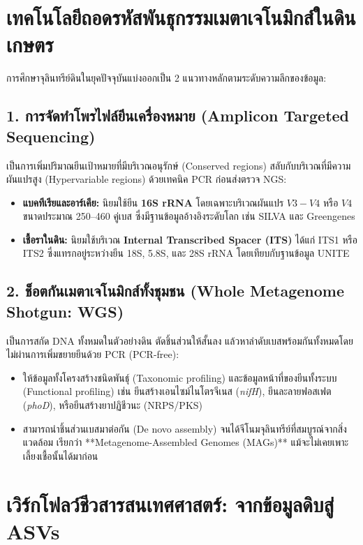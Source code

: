 \section{เทคโนโลยีถอดรหัสพันธุกรรมเมตาเจโนมิกส์ในดินเกษตร}

การศึกษาจุลินทรีย์ดินในยุคปัจจุบันแบ่งออกเป็น 2 แนวทางหลักตามระดับความลึกของข้อมูล:

\subsection{1. การจัดทำโพรไฟล์ยีนเครื่องหมาย (Amplicon Targeted Sequencing)}
เป็นการเพิ่มปริมาณยีนเป้าหมายที่มีบริเวณอนุรักษ์ (Conserved regions) สลับกับบริเวณที่มีความผันแปรสูง (Hypervariable regions) ด้วยเทคนิค PCR ก่อนส่งตรวจ NGS:
\begin{itemize}
    \item \textbf{แบคทีเรียและอาร์เคีย:} นิยมใช้ยีน \textbf{16S rRNA} โดยเฉพาะบริเวณผันแปร $V3-V4$ หรือ $V4$ ขนาดประมาณ 250--460 คู่เบส ซึ่งมีฐานข้อมูลอ้างอิงระดับโลก เช่น SILVA และ Greengenes
    \item \textbf{เชื้อราในดิน:} นิยมใช้บริเวณ \textbf{Internal Transcribed Spacer (ITS)} ได้แก่ ITS1 หรือ ITS2 ซึ่งแทรกอยู่ระหว่างยีน 18S, 5.8S, และ 28S rRNA โดยเทียบกับฐานข้อมูล UNITE
\end{itemize}

\subsection{2. ช็อตกันเมตาเจโนมิกส์ทั้งชุมชน (Whole Metagenome Shotgun: WGS)}
เป็นการสกัด DNA ทั้งหมดในตัวอย่างดิน ตัดชิ้นส่วนให้สั้นลง แล้วหาลำดับเบสพร้อมกันทั้งหมดโดยไม่ผ่านการเพิ่มขยายยีนด้วย PCR (PCR-free):
\begin{itemize}
    \item ให้ข้อมูลทั้งโครงสร้างชนิดพันธุ์ (Taxonomic profiling) และข้อมูลหน้าที่ของยีนทั้งระบบ (Functional profiling) เช่น ยีนสร้างเอนไซม์ไนโตรจีเนส (\textit{nifH}), ยีนละลายฟอสเฟต (\textit{phoD}), หรือยีนสร้างยาปฏิชีวนะ (NRPS/PKS)
    \item สามารถนำชิ้นส่วนเบสมาต่อกัน (De novo assembly) จนได้จีโนมจุลินทรีย์ที่สมบูรณ์จากสิ่งแวดล้อม เรียกว่า **Metagenome-Assembled Genomes (MAGs)** แม้จะไม่เคยเพาะเลี้ยงเชื้อนั้นได้มาก่อน
\end{itemize}

\section{เวิร์กโฟลว์ชีวสารสนเทศศาสตร์: จากข้อมูลดิบสู่ ASVs}

